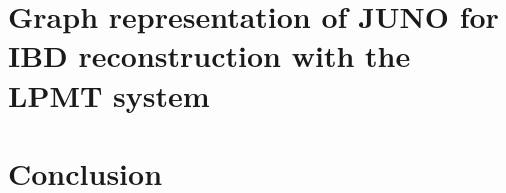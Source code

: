 \documentclass[
10pt, %
english, %
onehalfspacing, %
nolistspacing, %
toctotoc, %
headsepline, %
]{MastersDoctoralThesis} %
\begin{document}






\chapter{Graph representation of JUNO for IBD reconstruction with the LPMT system}
\label{sec:jgnn}





\chapter{Conclusion}

\printbibliography[heading=bibintoc]
\end{document}
